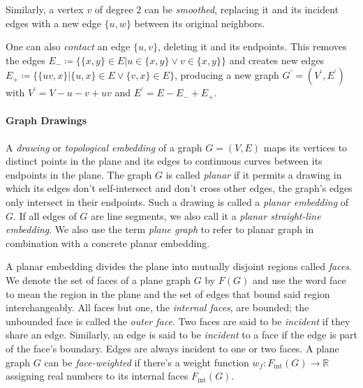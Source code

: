 \begin{definition}
	Similarly, a vertex $v$ of degree 2 can be \emph{smoothed}, replacing it and its incident edges with a new edge $\{u,w\}$ between its original neighbors.
\end{definition}

\begin{definition}
	One can also \emph{contact} an edge $\{u,v\}$, deleting it and  its endpoints.
	This removes the edges $E_- \coloneqq \{ \{x,y\} \in E \vert u \in \{x,y\} \lor v \in \{x,y\} \}$ and creates new edges $E_+ \coloneqq \{ \{uv,x\} \vert \{u,x\} \in E \lor \{v,x\} \in E \}$, producing a new graph $G^\prime = (V^\prime, E^\prime)$ with $V^\prime = V - u - v + uv$ and $E^\prime = E - E_- + E_+$.
\end{definition}



\paragraph{Graph Drawings}

\begin{definition}
	A \emph{drawing} or \emph{topological embedding} of a graph $G = (V, E)$ maps its vertices to distinct points in the plane and its edges to continuous curves between its endpoints in the plane.
	The graph $G$ is called \emph{planar} if it permits a drawing in which its edges don't self-intersect and don't cross other edges, \ie{} the graph's edges only intersect in their endpoints.
	Such a drawing is called a \emph{planar embedding} of $G$. If all edges of $G$ are line segments, we also call it a \emph{planar straight-line embedding}.
	We also use the term \emph{plane graph} to refer to planar graph in combination with a concrete planar embedding.
\end{definition}

\begin{definition}
	A planar embedding divides the plane into mutually disjoint regions called \emph{faces}. We denote the set of faces of a plane graph $G$ by $F(G)$ and use the word face to mean the region in the plane and the set of edges that bound said region interchangeably.
	All faces but one, the \emph{internal faces}, are bounded; the unbounded face is called the \emph{outer face}.
	Two faces are said to be \emph{incident} if they share an edge.
	Similarly, an edge is said to be \emph{incident} to a face if the edge is part of the face's boundary. Edges are always incident to one or two faces.
	A plane graph $G$ can be \emph{face-weighted} if there's a weight function $w_f \colon F_\text{int}(G) \to \mathbb{R}$ assigning real numbers to its internal faces $F_\text{int}(G)$.
\end{definition}

